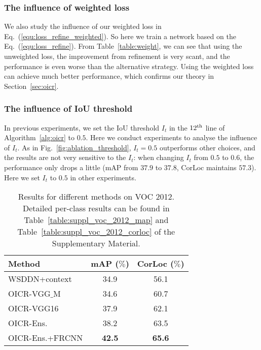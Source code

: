 \documentclass[10pt,twocolumn,letterpaper]{article}
\def\methodname{OICR}
\begin{document}
\subsubsection{The influence of weighted loss}
\label{sec:influence_wl}

We also study the influence of our weighted loss in Eq.~(\ref{equ:loss_refine_weighted}).
So here we train a network based on the Eq.~(\ref{equ:loss_refine}).
From Table~\ref{table:weight}, we can see that using the unweighted loss, the improvement from refinement is very scant, and the performance is even worse than the alternative strategy.
Using the weighted loss can achieve much better performance, which confirms our theory in Section~\ref{sec:oicr}.


\subsubsection{The influence of IoU threshold}
\label{sec:influence_it}

In previous experiments, we set the IoU threshold $I_{t}$ in the $12^{\textup{th}}$ line of Algorithm~\ref{alg:oicr} to $0.5$.
Here we conduct experiments to analyse the influence of $I_{t}$.
As in Fig.~\ref{fig:ablation_threshold}, $I_{t}=0.5$ outperforms other choices, and the results are not very sensitive to the $I_{t}$: when changing $I_{t}$ from $0.5$ to $0.6$, the performance only drops a little (mAP from $37.9$ to $37.8$, CorLoc maintains $57.3$).
Here we set $I_{t}$ to $0.5$ in other experiments.



\begin{table}[t]
\begin{center}
\footnotesize
\begin{tabular}{|l|c|c|}
   \hline
   Method & mAP ($\%$) & CorLoc ($\%$) \\
   \hline\hline
   WSDDN+context \cite{Ref:Kantorov2016} & 34.9 & 56.1 \\
   \hline
   \methodname-VGG$\_$M & 34.6 & 60.7\\
   \methodname-VGG16 & 37.9 & 62.1\\
   \hline
   \methodname-Ens. & 38.2 & 63.5 \\
   \methodname-Ens.+FRCNN & \bf{42.5} & \bf{65.6} \\
   \hline
\end{tabular}
\end{center}
\caption{Results for different methods on VOC 2012. Detailed per-class results can be found in Table~\ref{table:suppl_voc_2012_map} and Table~\ref{table:suppl_voc_2012_corloc} of the Supplementary Material.}
\label{table:voc_2012}
\end{table}
\end{document}
